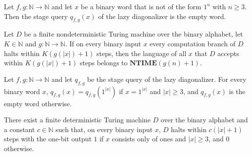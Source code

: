 \begin{theorem}
\label{Turing.NTimeDiag.query_of_not_guard}
\leanok
{}
Let $f, g : \mathbb{N} \to \mathbb{N}$ and let $x$ be a binary word that is not of the form $1^n$
with $n \ge 3$. Then the stage query $q_{f,g}(x)$ of the lazy diagonalizer is the empty word.
\end{theorem}

\begin{theorem}
\label{Turing.NTimeDiag.acceptLang_mem_NTIME}
\leanok
{}
Let $D$ be a finite nondeterministic Turing machine over the binary alphabet, let
$K \in \mathbb{N}$ and $g : \mathbb{N} \to \mathbb{N}$. If on every binary input $x$ every
computation branch of $D$ halts within $K(g(|x|) + 1)$ steps, then the language of all $x$ that
$D$ accepts within $K(g(|x|) + 1)$ steps belongs to $\mathbf{NTIME}(g(n) + 1)$.
\end{theorem}

\begin{theorem}
\label{Turing.NTimeDiag.qy_guard}
\leanok
{}
Let $f, g : \mathbb{N} \to \mathbb{N}$ and let $q_{f,g}$ be the stage query of the lazy
diagonalizer. For every binary word $x$, $q_{f,g}(x) = q_{f,g}(1^{|x|})$ if $x = 1^{|x|}$ and
$|x| \ge 3$, and $q_{f,g}(x)$ is the empty word otherwise.
\end{theorem}

\begin{theorem}
\label{Turing.NTimeDiag.qy_guard_decider}
\leanok
{}
There exist a finite deterministic Turing machine $D$ over the binary alphabet and a constant
$c \in \mathbb{N}$ such that, on every binary input $x$, $D$ halts within $c(|x| + 1)$ steps
with the one-bit output $1$ if $x$ consists only of ones and $|x| \ge 3$, and $0$ otherwise.
\end{theorem}

